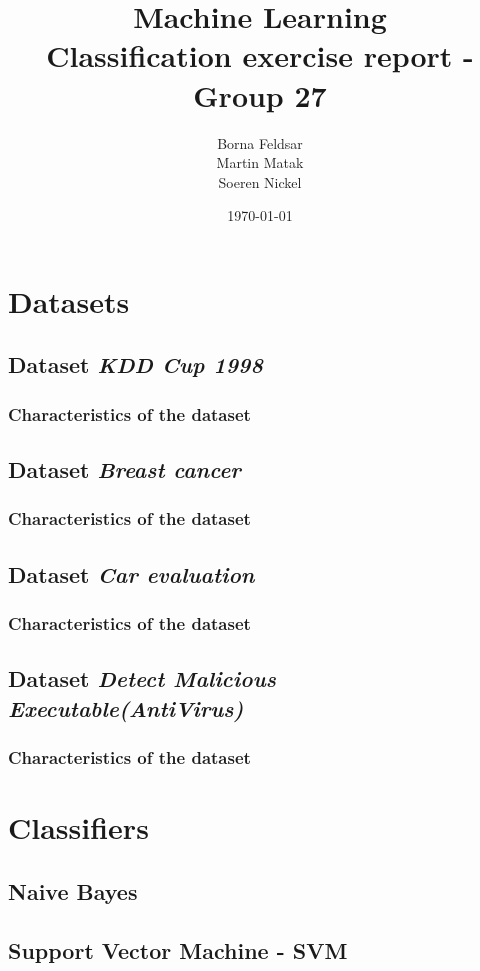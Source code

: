 \documentclass[11pt,a4paper,titlepage]{article}
\title{\blue Machine Learning \\
\blueb Classification exercise report - Group 27}
\author{Borna Feldsar \\ Martin Matak \\ Soeren Nickel}
\date{\today}
\begin{document}
\maketitle

\section{Datasets}
\subsection{Dataset \textit{KDD Cup 1998}}
\subsubsection{Characteristics of the dataset}

\subsection{Dataset \textit{Breast cancer}}
\subsubsection{Characteristics of the dataset}

\subsection{Dataset \textit{Car evaluation}}
\subsubsection{Characteristics of the dataset}

\subsection{Dataset \textit{Detect Malicious Executable(AntiVirus)}}
\subsubsection{Characteristics of the dataset}


\section{Classifiers}
\subsection{Naive Bayes}
\subsection{Support Vector Machine - SVM}
\end{document}
